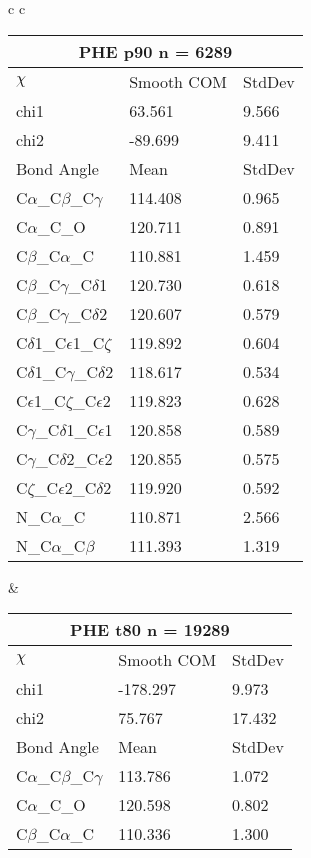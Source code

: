 \begin{longtable}{ c c }

  \begin{tabular}{ l l l }
  \toprule
  \multicolumn{3}{c}{PHE \textbf{p90} n = 6289} \\ \toprule
  $\chi$       & Smooth COM & StdDev \\ \midrule
  chi1 & 63.561 & 9.566 \\ 
  chi2 & -89.699 & 9.411 \\ \midrule
  Bond Angle   & Mean     & StdDev \\ \midrule
  C$\alpha$\_C$\beta$\_C$\gamma$ & 114.408 & 0.965\\
  C$\alpha$\_C\_O & 120.711 & 0.891\\
  C$\beta$\_C$\alpha$\_C & 110.881 & 1.459\\
  C$\beta$\_C$\gamma$\_C$\delta$1 & 120.730 & 0.618\\
  C$\beta$\_C$\gamma$\_C$\delta$2 & 120.607 & 0.579\\
  C$\delta$1\_C$\epsilon$1\_C$\zeta$ & 119.892 & 0.604\\
  C$\delta$1\_C$\gamma$\_C$\delta$2 & 118.617 & 0.534\\
  C$\epsilon$1\_C$\zeta$\_C$\epsilon$2 & 119.823 & 0.628\\
  C$\gamma$\_C$\delta$1\_C$\epsilon$1 & 120.858 & 0.589\\
  C$\gamma$\_C$\delta$2\_C$\epsilon$2 & 120.855 & 0.575\\
  C$\zeta$\_C$\epsilon$2\_C$\delta$2 & 119.920 & 0.592\\
  N\_C$\alpha$\_C & 110.871 & 2.566\\
  N\_C$\alpha$\_C$\beta$ & 111.393 & 1.319\\
  \bottomrule
  \end{tabular}
  &
  \begin{tabular}{ l l l }
  \toprule
  \multicolumn{3}{c}{PHE \textbf{t80} n = 19289} \\ \toprule
  $\chi$       & Smooth COM & StdDev \\ \midrule
  chi1 & -178.297 & 9.973 \\ 
  chi2 & 75.767 & 17.432 \\ \midrule
  Bond Angle   & Mean     & StdDev \\ \midrule
  C$\alpha$\_C$\beta$\_C$\gamma$ & 113.786 & 1.072\\
  C$\alpha$\_C\_O & 120.598 & 0.802\\
  C$\beta$\_C$\alpha$\_C & 110.336 & 1.300\\

\end{tabular}
\end{longtable}
